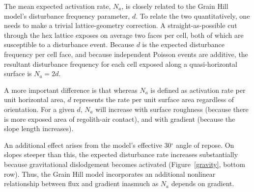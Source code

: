 \documentclass[esurf, manuscript]{copernicus}
\begin{document}
The mean expected activation rate, $N_a$, is closely related to the Grain Hill model's disturbance frequency parameter, $d$. To relate the two quantitatively, one needs to make a trivial lattice-geometry correction. A straight-as-possible cut through the hex lattice exposes on average two faces per cell, both of which are susceptible to a disturbance event. Because $d$ is the expected disturbance frequency per cell face, and because independent Poisson events are additive, the resultant disturbance frequency for each cell exposed along a quasi-horizontal surface is $N_a = 2d$.

A more important difference is that whereas $N_a$ is defined as activation rate per unit horizontal area, $d$ represents the rate per unit surface area regardless of orientation. For a given $d$, $N_a$ will increase with surface roughness (because there is more exposed area of regolith-air contact), and with gradient (because the slope length increases).

An additional effect arises from the model's effective 30$^\circ$ angle of repose. On slopes steeper than this, the expected disturbance rate increases substantially because gravitational dislodgement becomes activated (Figure~\ref{gravity}, bottom row). Thus, the Grain Hill model incorporates an additional nonlinear relationship between flux and gradient inasmuch as $N_a$ depends on gradient.

\end{document}
